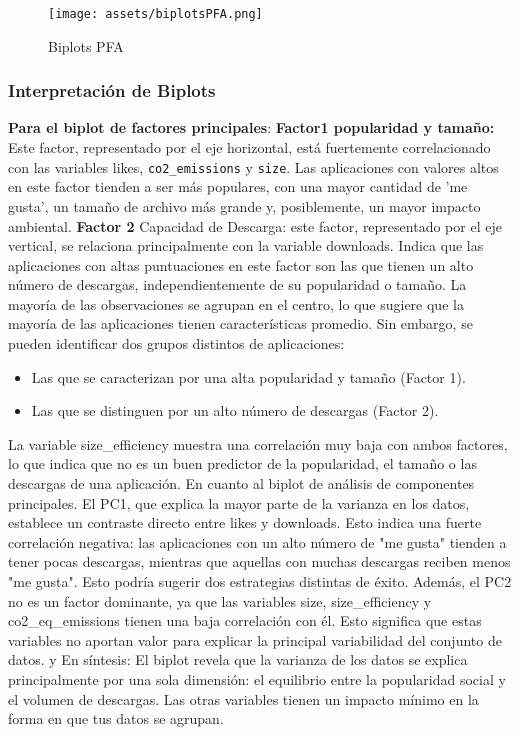 \documentclass[journal]{IEEEtran}
\begin{document}
	\begin{figure}[H]
		\centering
		\texttt{[image: assets/biplotsPFA.png]}
		\caption{Biplots PFA}
		\label{fig:pca_scatter}
	\end{figure}
	\subsubsection{Interpretación de Biplots}
	\textbf{Para el biplot de factores principales}: \textbf{Factor1 popularidad y tamaño:} Este factor, representado por el eje horizontal, está fuertemente correlacionado con las variables likes, \texttt{co2\_emissions} y \texttt{size}. Las aplicaciones con valores altos en este factor tienden a ser más populares, con una mayor cantidad de 'me gusta', un tamaño de archivo más grande y, posiblemente, un mayor impacto ambiental.
	\textbf{Factor 2} Capacidad de Descarga: este factor, representado por el eje vertical, se relaciona principalmente con la variable downloads. Indica que las aplicaciones con altas puntuaciones en este factor son las que tienen un alto número de descargas, independientemente de su popularidad o tamaño.
	La mayoría de las observaciones se agrupan en el centro, lo que sugiere que la mayoría de las aplicaciones tienen características promedio. Sin embargo, se pueden identificar dos grupos distintos de aplicaciones:
	\begin{itemize}
		\item Las que se caracterizan por una alta popularidad y tamaño (Factor 1).
		\item Las que se distinguen por un alto número de descargas (Factor 2).
	\end{itemize}
	La variable size\_efficiency muestra una correlación muy baja con ambos factores, lo que indica que no es un buen predictor de la popularidad, el tamaño o las descargas de una aplicación.
	En cuanto al biplot de análisis de componentes principales. El PC1, que explica la mayor parte de la varianza en los datos, establece un contraste directo entre likes y downloads. Esto indica una fuerte correlación negativa: las aplicaciones con un alto número de "me gusta" tienden a tener pocas descargas, mientras que aquellas con muchas descargas reciben menos "me gusta". Esto podría sugerir dos estrategias distintas de éxito. Además, el PC2 no es un factor dominante, ya que las variables size, size\_efficiency y co2\_eq\_emissions tienen una baja correlación con él. Esto significa que estas variables no aportan valor para explicar la principal variabilidad del conjunto de datos. y En síntesis:
	El biplot revela que la varianza de los datos se explica principalmente por una sola dimensión: el equilibrio entre la popularidad social y el volumen de descargas. Las otras variables tienen un impacto mínimo en la forma en que tus datos se agrupan.
\end{document}
